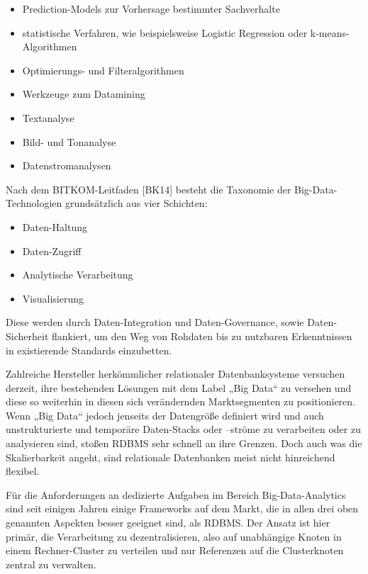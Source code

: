 \begin{itemize}
		\item Prediction-Models zur Vorhersage bestimmter Sachverhalte
		\item statistische Verfahren, wie beispielsweise Logistic Regression oder k-means-Algorithmen 
		\item Optimierungs- und Filteralgorithmen 
		\item Werkzeuge zum Datamining
		\item Textanalyse
		\item Bild- und Tonanalyse
		\item Datenstromanalysen
\end{itemize}	



Nach dem BITKOM-Leitfaden [BK14] besteht die Taxonomie der Big-Data-Technologien grundsätzlich aus vier Schichten:


\begin{itemize}
		\item Daten-Haltung
		\item Daten-Zugriff 
		\item Analytische Verarbeitung
		\item Visualisierung
\end{itemize}	


Diese werden durch Daten-Integration und Daten-Governance, sowie Daten-Sicherheit flankiert, um den Weg von Rohdaten bis zu nutzbaren Erkenntnissen in existierende Standards einzubetten.

Zahlreiche Hersteller herkömmlicher relationaler Datenbanksysteme versuchen derzeit, ihre bestehenden Lösungen mit dem Label „Big Data“ zu versehen und diese so weiterhin in diesen sich verändernden Marktsegmenten zu positionieren. Wenn „Big Data“ jedoch jenseits der Datengröße definiert wird und auch unstrukturierte und temporäre Daten-Stacks oder –ströme zu verarbeiten oder zu analysieren sind, stoßen RDBMS sehr schnell an ihre Grenzen. Doch auch was die Skalierbarkeit angeht, sind relationale Datenbanken meist nicht hinreichend flexibel. 

Für die Anforderungen an dedizierte Aufgaben im Bereich Big-Data-Analytics sind seit einigen Jahren einige Frameworks auf dem Markt, die in allen drei oben genannten Aspekten besser geeignet sind, als RDBMS. Der Ansatz ist hier primär, die Verarbeitung zu dezentralisieren, also auf unabhängige Knoten in einem Rechner-Cluster zu verteilen und nur Referenzen auf die Clusterknoten zentral zu verwalten.  

